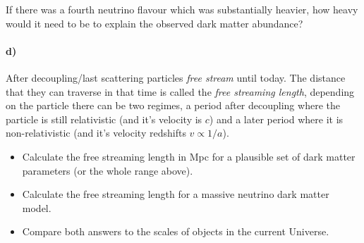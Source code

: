 \documentclass[12pt]{article}
\begin{document}
If there was a fourth neutrino flavour which was substantially heavier, how heavy would it need to be to explain the observed dark matter abundance?

\paragraph{d)} After decoupling/last scattering particles \emph{free stream} until today. The distance that they can traverse in that time is called the \emph{free streaming length}, depending on the particle there can be two regimes, a period after decoupling where the particle is still relativistic (and it's velocity is $c$) and a later period where it is non-relativistic (and it's velocity redshifts $v \propto 1 / a$).

\begin{itemize}
    \item Calculate the free streaming length in Mpc for a plausible set of dark matter parameters (or the whole range above).
    \item Calculate the free streaming length for a massive neutrino dark matter model.
    \item Compare both answers to the scales of objects in the current Universe.
\end{itemize}
\end{document}
